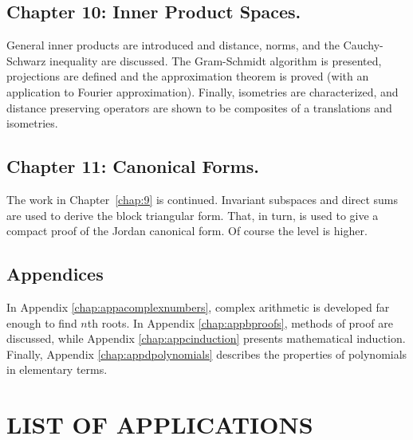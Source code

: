 \subsection*{Chapter 10: Inner Product Spaces.}


General inner products are introduced 
and distance, norms, and the Cauchy-Schwarz inequality are discussed. 
The Gram-Schmidt algorithm is presented, projections are defined and the
 approximation theorem is proved (with an application to Fourier 
approximation). Finally, isometries are characterized, and distance 
preserving operators are shown to be composites of a translations and 
isometries.


\vspace*{-0.5em}
\subsection*{Chapter 11: Canonical Forms.}


The work in Chapter~\ref{chap:9}
 is continued. Invariant subspaces and direct sums are used to derive 
the block triangular form. That, in turn, is used to give a compact 
proof of the Jordan canonical form. Of course the level is higher.



\subsection*{Appendices}


In Appendix \ref{chap:appacomplexnumbers}, complex arithmetic is developed far enough to find $n$th roots. In Appendix \ref{chap:appbproofs}, methods of proof are discussed, while Appendix \ref{chap:appcinduction} presents mathematical induction. Finally, Appendix \ref{chap:appdpolynomials} describes the properties of polynomials in elementary terms.




\section*{LIST OF APPLICATIONS}

